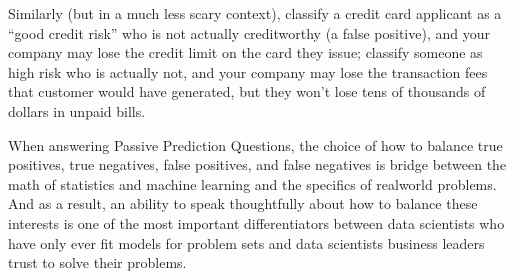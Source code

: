 \documentclass[letterpaper,10pt,english]{jupyterBook}
\begin{document}
\sphinxAtStartPar
Similarly (but in a much less scary context), classify a credit card applicant as a “good credit risk” who is not actually credit\sphinxhyphen{}worthy (a false positive), and your company may lose the credit limit on the card they issue; classify someone as high risk who is actually not, and your company may lose the transaction fees that customer would have generated, but they won’t lose tens of thousands of dollars in unpaid bills.

\sphinxAtStartPar
When answering Passive Prediction Questions, the choice of how to balance true positives, true negatives, false positives, and false negatives is  bridge between the math of statistics and machine learning and the specifics of real\sphinxhyphen{}world problems. And as a result, an ability to speak thoughtfully about how to balance these interests is one of the most important differentiators between data scientists who have only ever fit models for problem sets and data scientists business leaders trust to solve their problems.
\end{document}
